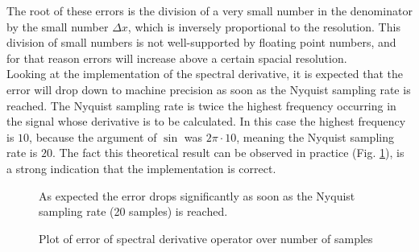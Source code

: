 The root of these errors is the division of a very small number in the denominator by the small number $\Delta x$, which is inversely proportional to the resolution.
This division of small numbers is not well-supported by floating point numbers, and for that reason errors will increase above a certain spacial resolution.\\
Looking at the implementation of the spectral derivative, it is expected that the error will drop down to machine precision as soon as the Nyquist sampling rate is reached.
The Nyquist sampling rate is twice the highest frequency occurring in the signal whose derivative is to be calculated.
In this case the highest frequency is $10$, because the argument of $\sin$ was $2\pi\cdot 10$, meaning the Nyquist sampling rate is $20$.
The fact this theoretical result can be observed in practice (Fig. \ref{fig:fft_error}), is a strong indication that the implementation is correct.

\begin{figure}[!h]
    \caption{Plot of error of spectral derivative operator over number of samples}
    \label{fig:fft_error}
    \small
    As expected the error drops significantly as soon as the Nyquist sampling rate (20 samples) is reached.
\end{figure}


